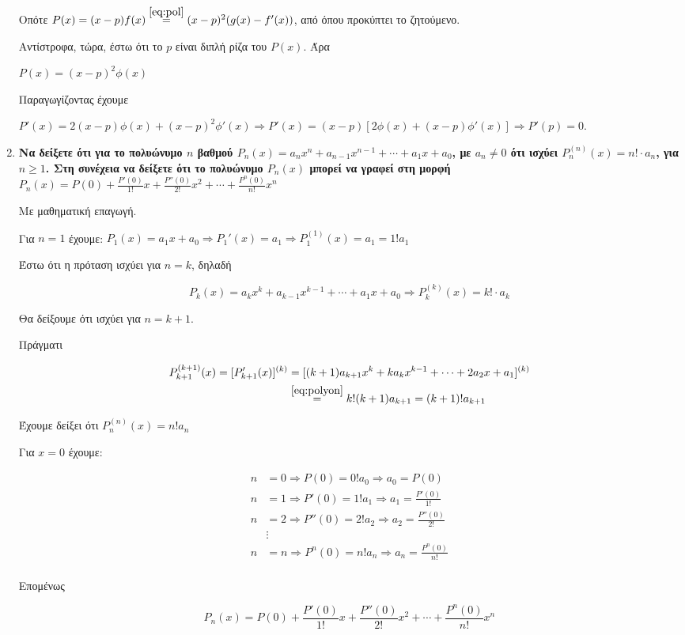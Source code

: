 \begin{enumerate}
			Οπότε $ P(x) = (x-p)f(x) \overset{\eqref{eq:pol}}{=} (x-p)^{2}(g(x)
			- f'(x)) $, από όπου προκύπτει το ζητούμενο.

			Αντίστροφα, τώρα, έστω ότι το $p$ είναι διπλή ρίζα του $ P(x) $. Άρα 

			$ P(x) = (x-p)^{2}\phi(x) $

			Παραγωγίζοντας έχουμε

			$ P'(x) = 2(x-p)\phi(x) + (x-p)^{2}\phi'(x) \Rightarrow P'(x) =
			(x-p)[2\phi(x) + (x-p)\phi'(x)] \Rightarrow P'(p) = 0 $.





		\item {\bfseries \boldmath Να δείξετε ότι για το πολυώνυμο $n$ βαθμού $ P_{n}(x) =a_{n}x^{n} +
		a_{n-1}x^{n-1} + \cdots + a_{1}x + a_{0} $, με  $ a_{n}\neq 0 $ ότι ισχύει $
		P_{n}^{(n)}(x) = n! \cdot a_{n}$, για  $n\geq 1 $. Στη συνέχεια να
		δείξετε ότι το πολυώνυμο $ P_{n}(x) $ μπορεί να γραφεί στη μορφή $ P_{n}(x) =
		P(0) + \frac{P'(0)}{1!} x + \frac{P''(0)}{2!} x^{2} + \cdots +
	\frac{P^{n}(0)}{n!} x^{n}$} 





		Με μαθηματική επαγωγή.

		Για $ n=1 $ έχουμε: $ P_{1}(x) = a_{1}x + a_{0} \Rightarrow P_{1}'(x) =
		a_{1} \Rightarrow P_{1}^{(1)}(x)
		= a_{1} = 1!a_{1} $ 

		Έστω ότι η πρόταση ισχύει για $ n = k  $, δηλαδή

		\begin{equation}\label{eq:polyon}
			P_{k}(x) = a_{k}x^{k} + a_{k-1}x^{k-1}+ \cdots +a_{1}x + a_{0}
			\Rightarrow P_{k}^{(k)}(x) = k!\cdot a_{k}
		\end{equation}

		Θα δείξουμε ότι ισχύει για $ n = k+1 $.

		Πράγματι

		\begin{align*}
			P_{k+1}^{(k+1)}(x) = [P_{k+1}'(x)]^{(k)} 
			&= [(k+1)a_{k+1}x^{k} +	ka_{k}x^{k-1} + \cdots + 2a_{2}x + a_{1}]^{(k)} \\
			&\overset{\eqref{eq:polyon}}{=} k! (k+1) a_{k+1} = (k+1)!a_{k+1}
		\end{align*}	

		Έχουμε δείξει ότι $ P_{n}^{(n)}(x) = n! a_{n} $

		Για $ x = 0 $ έχουμε:

		\begin{align*}
			n &= 0 \Rightarrow P(0) = 0!a_{0} \Rightarrow a_{0} = P(0) \\
			n &= 1 \Rightarrow P'(0) = 1!a_{1} \Rightarrow a_{1} = \frac{P'(0)}{1!} \\ 
			n &= 2 \Rightarrow P''(0) = 2!a_{2} \Rightarrow a_{2} = \frac{P''(0)}{2!} \\
			  &\vdots \\
			n &= n \Rightarrow P^{n}(0) = n!a_{n} \Rightarrow a_{n} = \frac{P^{n}(0)}{n!} \\
		\end{align*}	

		Επομένως 

		\[
			P_{n}(x) = P(0) + \frac{P'(0)}{1!} x + \frac{P''(0)}{2!} x^{2} + \cdots
			+ \frac{P^{n}(0)}{n!} x^{n}
		\]
\end{enumerate}


